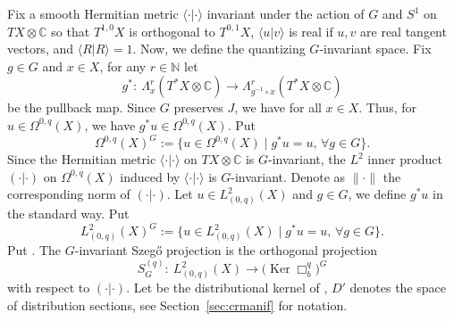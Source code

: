 \documentclass[10pt,a4paper]{amsart}
\numberwithin{equation}{section}
\newcommand{\To}{\rightarrow}
\begin{document}
Fix a smooth Hermitian metric $\langle \cdot | \cdot \rangle$ invariant under the action of $G$ and $S^1$ on $TX\otimes \mathbb{C}$ so that $T^{1,0}X$ is orthogonal to $T^{0,1}X$, $\langle u | v \rangle$ is real if $u, v$ are real tangent vectors, and $\langle R | R \rangle=1$. Now, we define the quantizing $G$-invariant space. Fix $g\in G$ and $x\in X$, for any $r\in \mathbb{N}$ let
\[
g^*\colon \
\Lambda^r_x(T^*X\otimes \mathbb{C})\To\Lambda^r_{g^{-1}\circ x}( T^*X\otimes \mathbb{C})
\]
 be the pullback map. Since $G$ preserves $J$, we have
\smash{$
g^*\colon T^{*0,q}_xX\To T^{*0,q}_{g^{-1}\circ x}X
$}
 for all $x\in X$. Thus, for $u\in\Omega^{0,q}(X)$, we have $g^*u\in\Omega^{0,q}(X)$. Put
 \[\Omega^{0,q}(X)^G:=\big\{u\in\Omega^{0,q}(X) \mid g^*u=u,\,\forall g\in G\big\} .
 \]
	Since the Hermitian metric $\langle \cdot | \cdot \rangle$ on $TX\otimes \mathbb{C}$ is $G$-invariant, the $L^2$ inner product $( \cdot | \cdot )$ on $\Omega^{0,q}(X)$
	induced by $\langle \cdot | \cdot \rangle$ is $G$-invariant. Denote as $\lVert \cdot\rVert$ the corresponding norm of $( \cdot | \cdot )$. Let $u\in L^2_{(0,q)}(X)$ and $g\in G$, we define $g^*u$ in the standard way. Put
	\[L^2_{(0,q)}(X)^G:=\big\{u\in L^2_{(0,q)}(X)\mid g^*u=u,\,\forall g\in G\big\}.\]
	Put
. The $G$-invariant Szeg\H{o} projection is the orthogonal projection
	\[S^{(q)}_G\colon \ L^2_{(0,q)}(X)\To \bigl(\operatorname{Ker}\Box^q_b\bigr)^G\]
	with respect to $( \cdot | \cdot )$. Let  be the distributional kernel of , ${D}'$ denotes the space of distribution sections, see Section~\ref{sec:crmanif} for notation.
	
\end{document}
